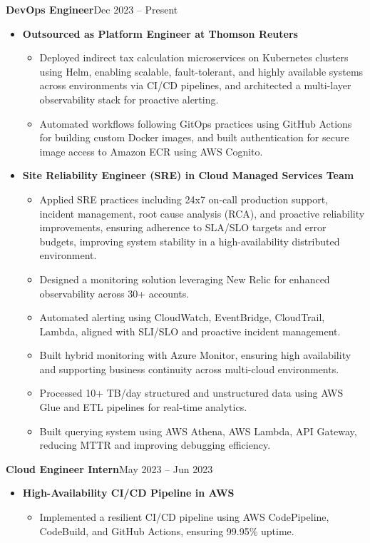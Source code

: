 \documentclass[a4paper,10.999999pt]{article}
\newenvironment{joblong}[2]
        {
        \noindent\textbf{#1}\hfill{#2}\par
        \vspace{0.3pt}
        \begin{minipage}[t]{\linewidth}
        \begin{itemize}[after=\strut, topsep=0.3pt, partopsep=0pt, parsep=0pt, leftmargin=0.5em, itemsep=0.35pt, label=\raisebox{0.2ex}{\tiny$\circ$}]
        }
        {
        \end{itemize}
        \end{minipage}
        \vspace{0.5pt}
        }
\begin{document}
    \begin{joblong}{DevOps Engineer}{Dec 2023 -- Present}
    Intuitive.Cloud
    \item \textbf{Outsourced as Platform Engineer at Thomson Reuters}
    \begin{itemize}
    \item Deployed indirect tax calculation microservices on Kubernetes clusters using Helm, enabling scalable, fault-tolerant, and highly available systems across environments via CI/CD pipelines, and architected a multi-layer observability stack for proactive alerting.
    \item Automated workflows following GitOps practices using GitHub Actions for building custom Docker images, and built authentication for secure image access to Amazon ECR using AWS Cognito.
    \end{itemize}
    \vspace{0.5pt}

    \item \textbf{Site Reliability Engineer (SRE) in Cloud Managed Services Team}
    \begin{itemize}
    \item Applied SRE practices including 24x7 on-call production support, incident management, root cause analysis (RCA), and proactive reliability improvements, ensuring adherence to SLA/SLO targets and error budgets, improving system stability in a high-availability distributed environment.
    \item Designed a monitoring solution leveraging New Relic for enhanced observability across 30+ accounts.
    \item Automated alerting using CloudWatch, EventBridge, CloudTrail, Lambda, aligned with SLI/SLO and proactive incident management.
    \item Built hybrid monitoring with Azure Monitor, ensuring high availability and supporting business continuity across multi-cloud environments.
    \item Processed 10+ TB/day structured and unstructured data using AWS Glue and ETL pipelines for real-time analytics.
    \item Built querying system using AWS Athena, AWS Lambda, API Gateway, reducing MTTR and improving debugging efficiency.
    \end{itemize}
    \end{joblong}

    \begin{joblong}{Cloud Engineer Intern}{May 2023 -- Jun 2023}
    Mactores Innovation
    \item \textbf{High-Availability CI/CD Pipeline in AWS}
    \begin{itemize}
    \item Implemented a resilient CI/CD pipeline using AWS CodePipeline, CodeBuild, and GitHub Actions, ensuring 99.95\% uptime.
    \end{itemize}
    \end{joblong}
\end{document}
